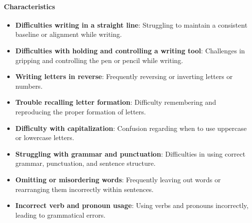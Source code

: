 \paragraph{Characteristics}
\begin{itemize}
    \item \textbf{Difficulties writing in a straight line}: Struggling to maintain a consistent baseline or alignment while writing.
    \item \textbf{Difficulties with holding and controlling a writing tool}: Challenges in gripping and controlling the pen or pencil while writing.
    \item \textbf{Writing letters in reverse}: Frequently reversing or inverting letters or numbers.
    \item \textbf{Trouble recalling letter formation}: Difficulty remembering and reproducing the proper formation of letters.
    \item \textbf{Difficulty with capitalization}: Confusion regarding when to use uppercase or lowercase letters.
    \item \textbf{Struggling with grammar and punctuation}: Difficulties in using correct grammar, punctuation, and sentence structure.
    \item \textbf{Omitting or misordering words}: Frequently leaving out words or rearranging them incorrectly within sentences.
    \item \textbf{Incorrect verb and pronoun usage}: Using verbs and pronouns incorrectly, leading to grammatical errors.
\end{itemize}

